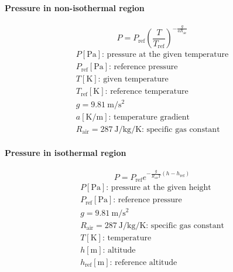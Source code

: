 \documentclass[10pt, twocolumn]{article}
\begin{document}
\paragraph{Pressure in non-isothermal region}
\[
  P = P_\mathrm{ref} \left( \frac{T}{T_\mathrm{ref}} \right)^{-\frac{g}{aR_\mathrm{air}}}
\]
\[
  \begin{array}{|l}
    P [\si{\pascal}] \text{: pressure at the given temperature}  \\
    P_\mathrm{ref} [\si{\pascal}] \text{: reference pressure}    \\
    T [\si{\kelvin}] \text{: given temperature}                  \\
    T_\mathrm{ref} [\si{\kelvin}] \text{: reference temperature} \\
    g = \SI{9.81}{\metre\per\second\squared}                     \\
    a [\si{\kelvin\per\metre}] \text{: temperature gradient}     \\
    R_\mathrm{air} = \SI[scientific-notation = false]{287}{\joule\per\kilogram\per\kelvin} \text{: specific gas constant}
  \end{array}
\]

\paragraph{Pressure in isothermal region}
\[
  P = P_\mathrm{ref} e^{-\frac{g}{R_\mathrm{air}T} \left( h - h_\mathrm{ref} \right)}
\]
\[
  \begin{array}{|l}
    P [\si{\pascal}] \text{: pressure at the given height}                                                                \\
    P_\mathrm{ref} [\si{\pascal}] \text{: reference pressure}                                                             \\
    g = \SI{9.81}{\metre\per\second\squared}                                                                              \\
    R_\mathrm{air} = \SI[scientific-notation = false]{287}{\joule\per\kilogram\per\kelvin} \text{: specific gas constant} \\
    T [\si{\kelvin}] \text{: temperature}                                                                                 \\
    h [\si{\metre}] \text{: altitude}                                                                                     \\
    h_\mathrm{ref} [\si{\metre}] \text{: reference altitude}                                                              \\
  \end{array}
\]
\end{document}
